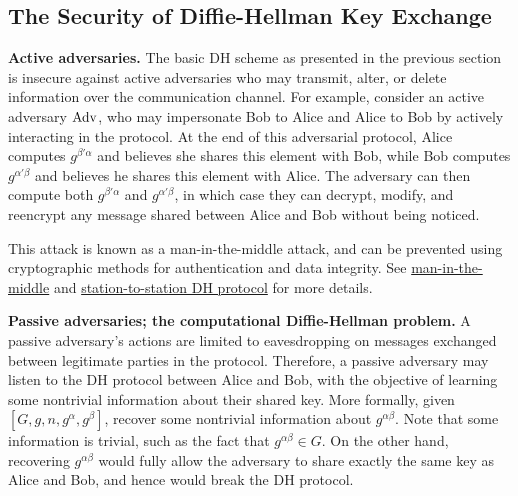 \subsection{The Security of Diffie-Hellman Key Exchange}

{\bf Active adversaries.} The basic DH scheme as presented in the previous 
section is insecure against active adversaries who may transmit, alter, or delete 
information over the communication channel. For example, consider an active 
adversary ${\rm Adv}$, who may impersonate Bob to Alice and Alice to Bob by 
actively interacting in the protocol. At the end of this adversarial protocol, 
Alice computes $g^{\beta'\alpha}$ and believes she shares this element with Bob, 
while Bob computes $g^{\alpha'\beta}$ and believes he shares this element with 
Alice. The adversary can then compute both $g^{\beta'\alpha}$ and $g^{\alpha'\beta}$, 
in which case they can decrypt, modify, and reencrypt any message shared between 
Alice and Bob without being noticed. 

\begin{center}
\end{center}

This attack is known as a man-in-the-middle attack, and can be prevented using 
cryptographic methods for authentication and data integrity. See 
\href{https://en.wikipedia.org/wiki/Man-in-the-middle_attack}{man-in-the-middle}
and \href{https://en.wikipedia.org/wiki/Station-to-Station_protocol}
{station-to-station DH protocol} for more details. 

{\bf Passive adversaries; the computational Diffie-Hellman problem.} A passive 
adversary's actions are limited to eavesdropping on messages exchanged between 
legitimate parties in the protocol. Therefore, a passive adversary may listen to 
the DH protocol between Alice and Bob, with the objective of learning some 
nontrivial information about their shared key. More formally, given 
$[G, g, n, g^\alpha, g^\beta]$, recover some nontrivial information about 
$g^{\alpha\beta}$. Note that some information is trivial, such as the fact that 
$g^{\alpha\beta} \in G$. On the other hand, recovering $g^{\alpha\beta}$ would 
fully allow the adversary to share exactly the same key as Alice and Bob, 
and hence would break the DH protocol. 

